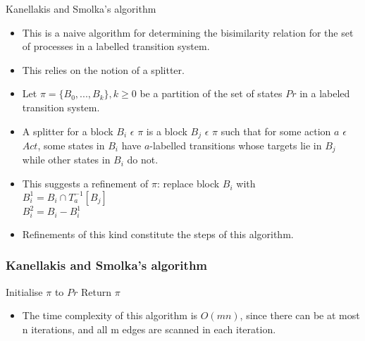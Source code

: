 \documentclass{beamer}
\begin{document}
\begin{frame}{Kanellakis and Smolka's algorithm}
  \begin{itemize}
  \item This is a naive algorithm for determining the bisimilarity
    relation for the set of processes in a labelled transition system.
  \item This relies on the notion of a splitter.
  \item Let $\pi = \{ B_0, ..., B_k \}, k \ge 0$ be a partition of the
    set of states $Pr$ in a labeled transition system.
  \item A splitter for a block $B_i$ $\epsilon$ $\pi$ is a block $B_j$
    $\epsilon$ $\pi$ such that for some action $a$ $\epsilon$ $Act$, some
    states in $B_i$ have $a$-labelled transitions whose targets lie in
    $B_j$ while other states in $B_i$ do not.
  \item This suggests a refinement of $\pi$: replace block $B_i$ with
    \\
    $B_i^1 = B_i \cap T_a^{-1}[B_j] $ \\
    $B_i^2 = B_i - B_i^1 $ 
  \item Refinements of this kind constitute the steps of this
    algorithm.
  \end{itemize}
\end{frame}

\begin{frame}[fragile]

  \frametitle{Kanellakis and Smolka's algorithm}

  \begin{algorithm2e}[H]
    Initialise $\pi$ to ${Pr}$\;
    Return $\pi$\;
\end{algorithm2e}

  \begin{itemize}
  \item The time complexity of this algorithm is $O(mn)$, since there
    can be at most n iterations, and all m edges are scanned in each iteration.
  \end{itemize}

\end{frame}

    
\end{document}
